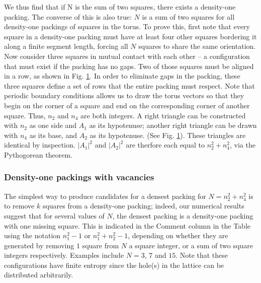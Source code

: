 \documentclass[aps]{revtex4}
\begin{document}
We thus find that if N is the sum of two squares, there exists a density-one packing. The converse of this is also true: $N$ is a sum of two squares for all density-one packings of squares in the torus. To prove this, first note that every square in a density-one packing must have at least four other squares bordering it along a finite segment length, forcing all $N$ squares to share the same orientation.  Now consider three squares in mutual contact with each other -- a configuration that must exist if the packing has no gaps. Two of those squares must be aligned in a row, as shown in Fig. \ref{fig:aligned}. In order to eliminate gaps in the packing, these three squares define a set of rows that the entire packing must respect. Note that periodic boundary conditions allows us to draw the torus vectors so that they begin on the corner of a square and end on the corresponding corner of another square.  Thus, $n_2$ and $n_4$ are both integers. A right triangle can be constructed with $n_2$ as one side and $A_1$ as its hypotenuse; another right triangle can be drawn with $n_4$ as its base, and $A_2$ as its hypotenuse. (See Fig. \ref{fig:aligned}). These triangles are identical by inspection.  $|A_1|^2$ and $|A_2|^2$ are therfore each equal to $n_2^2 + n_4^2$, via the Pythogorean theorem.

\begin{figure}[H]
\caption{\label{fig:aligned}}
\end{figure}

\subsubsection{Density-one packings with vacancies}
\label{sec:vacancies}
The simplest way to produce candidates for a densest packing for $N=n_2^2 + n_4^2$ is to remove $k$ squares from a density-one packing; indeed, our numerical results suggest that for several values of $N$, the densest packing is a density-one packing with one missing square.  This is indicated in the Comment column in the Table using the notation $n_1^2-1$ or $n_1^2+ n_2^2-1$, depending on whether they are generated by removing $1$ square from $N$ a square integer, or a sum of two square integers respectively. Examples include $N=3$, $7$ and $15$. Note that these configurations have finite entropy since the hole(s) in the lattice can be distributed arbitrarily.
\end{document}
